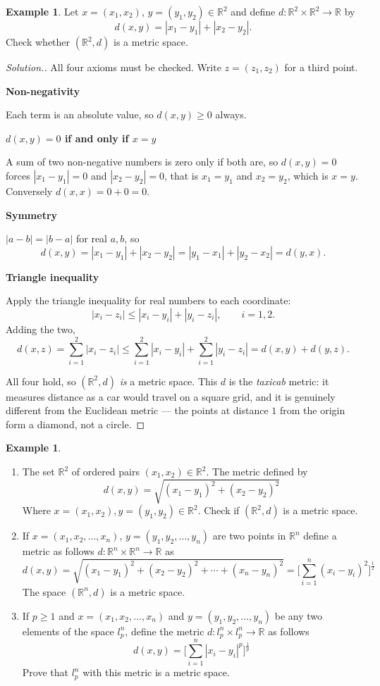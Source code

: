 \documentclass[11pt,a4paper]{article}
\theoremstyle{definition}
\newtheorem{exa}[thm]{Example}
\newenvironment{solution}
  {\renewcommand{\qedsymbol}{}\begin{proof}[\textit{Solution}.]}
  {\end{proof}}
\newcommand{\subhead}[1]{%
  \par\medskip\noindent\textbf{#1}\par\nobreak\smallskip}
\begin{document}
\begin{exa}
Let $x=(x_1,x_2)$, $y=(y_1,y_2)\in \mathbb{R}^2$ and define
$d:\mathbb{R}^2\times \mathbb{R}^2\rightarrow \mathbb{R}$ by
$$d(x,y)=|x_1-y_1|+|x_2-y_2| .$$
Check whether $(\mathbb{R}^2,d)$ is a metric space.
\end{exa}
\begin{solution}
All four axioms must be checked. Write $z=(z_1,z_2)$ for a third point.

\subhead{Non-negativity}
Each term is an absolute value, so $d(x,y)\geq 0$ always.

\subhead{$d(x,y)=0$ if and only if $x=y$}
A sum of two non-negative numbers is zero only if both are, so $d(x,y)=0$
forces $|x_1-y_1|=0$ and $|x_2-y_2|=0$, that is $x_1=y_1$ and $x_2=y_2$, which
is $x=y$. Conversely $d(x,x)=0+0=0$.

\subhead{Symmetry}
$|a-b|=|b-a|$ for real $a,b$, so
$$d(x,y)=|x_1-y_1|+|x_2-y_2|=|y_1-x_1|+|y_2-x_2|=d(y,x).$$

\subhead{Triangle inequality}
Apply the triangle inequality for real numbers to each coordinate:
$$|x_i-z_i|\leq |x_i-y_i|+|y_i-z_i|,\qquad i=1,2 .$$
Adding the two,
$$d(x,z)=\sum_{i=1}^{2}|x_i-z_i|
\leq \sum_{i=1}^{2}|x_i-y_i|+\sum_{i=1}^{2}|y_i-z_i|=d(x,y)+d(y,z).$$

All four hold, so $(\mathbb{R}^2,d)$ \emph{is} a metric space. This $d$ is the
\emph{taxicab} metric: it measures distance as a car would travel on a square
grid, and it is genuinely different from the Euclidean metric --- the points at
distance $1$ from the origin form a diamond, not a circle.
\end{solution}



\begin{exa}
\begin{enumerate}
\item The set $\mathbb{R}^2$ of ordered pairs $(x_1,x_2)\in \mathbb{R}^2$. The metric defined by $$d(x,y)=\sqrt{(x_1-y_1)^2+(x_2-y_2)^2}$$ Where $x=(x_1,x_2), y=(y_1,y_2)\in \mathbb{R}^2$.  Check if $(\mathbb{R}^2,d)$ is a metric space.
\item If $x=(x_1,x_2,\dots,x_n)$, $y=(y_1,y_2,\dots,y_n)$ are two points in $\mathbb{R}^n$ define a metric as follows $d:\mathbb{R}^n\times \mathbb{R}^n\rightarrow \mathbb{R}$ as $$d(x,y)=\sqrt{(x_1-y_1)^2+(x_2-y_2)^2+\cdots+(x_n-y_n)^2}=\Bigg[\sum^n_{i=1}(x_i-y_i)^2\Bigg]^{\frac{1}{2}}$$ The space $(\mathbb{R}^n,d)$ is a metric space.
\item If $p\geq 1$ and $x=(x_1,x_2,\dots,x_n)$ and $y=(y_1,y_2,\dots,y_n)$ be any two elements of the space $l_p^n$, define the metric $d:l_p^n\times l_p^n\rightarrow \mathbb{R}$ as follows $$d(x,y)=\Bigg[\sum^n_{i=1}|x_i-y_i|^p\Bigg]^{\frac{1}{p}}$$ Prove that $l^n_p$ with this metric is a metric space.\\ 
\end{enumerate}
\end{exa}
\end{document}
